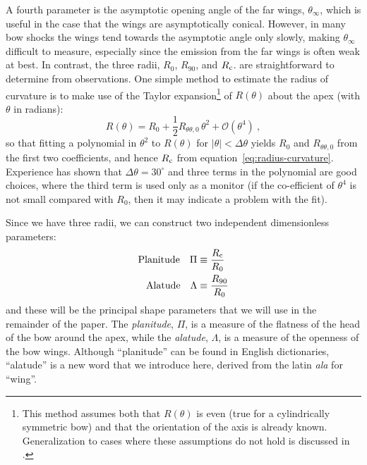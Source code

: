 A fourth parameter is the asymptotic opening angle of the far wings,
\(\theta_\infty\), which is useful in the case that the wings are asymptotically
conical.  However, in many bow shocks the wings tend towards the
asymptotic angle only slowly, making \(\theta_\infty\) difficult to measure,
especially since the emission from the far wings is often weak at
best.  In contrast, the three radii, \(R_0\), \(R_{90}\), and
\(R_{\mathrm{c}}\). are straightforward to determine from observations.  One
simple method to estimate the radius of curvature is to make use of
the Taylor expansion\footnote{%
  This method assumes both that \(R(\theta)\) is even (true for a
  cylindrically symmetric bow) and that the orientation of the axis is
  already known.  Generalization to cases where these assumptions do
  not hold is discussed in \citet{Henney:2017a}.} %
of \(R(\theta)\) about the apex (with \(\theta\) in
radians):
\begin{equation}
  \label{eq:taylor-R-theta}
  R(\theta) = R_0 + \frac12 R_{\theta\theta,0} \,\theta^2 + \mathcal{O}(\theta^4) \ ,
\end{equation}
so that fitting a polynomial in \(\theta^2\) to \(R(\theta)\) for
\(|\theta| < \Delta\theta \) yields \(R_0\) and \(R_{\theta\theta,0}\) from the first two
coefficients, and hence \(R_{\mathrm{c}}\) from
equation~\eqref{eq:radius-curvature}.  Experience has shown that
\(\Delta\theta = 30^\circ\) and three terms in the polynomial are good choices,
where the third term is used only as a monitor (if the co-efficient of
\(\theta^4\) is not small compared with \(R_0\), then it may indicate a
problem with the fit).

Since we have three radii, we can construct two independent
dimensionless parameters:
\begin{align}
  \label{eq:planitude}
  \text{Planitude} \quad \Pi & \equiv  \frac{R_{\mathrm{c}}} {R_0} \\
  \label{eq:alatude}
  \text{Alatude} \quad \Lambda & \equiv  \frac{R_{90}} {R_0}
\end{align}
and these will be the principal shape parameters that we will use in
the remainder of the paper.  The \textit{planitude}, \(\Pi\), is a
measure of the flatness of the head of the bow around the apex, while
the \textit{alatude}, \(\Lambda\), is a measure of the openness of the bow
wings.  Although ``planitude'' can be found in English dictionaries,
``alatude'' is a new word that we introduce here, derived from the
latin \textit{ala} for ``wing''.

